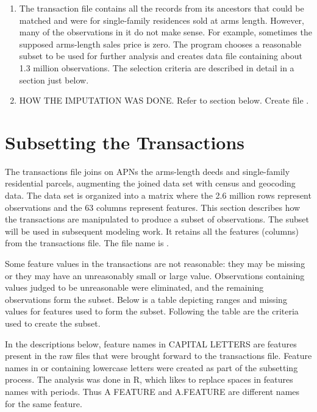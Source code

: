\begin{enumerate}
\item The transaction file contains all the records from its ancestors
  that could be matched and were for single-family residences sold at
  arms length. However, many of the observations in it do not make
  sense. For example, sometimes the supposed arms-length sales price
  is zero. The program  chooses a reasonable
  subset to be used for further analysis and creates data file
   containing about 1.3 million observations. The
  selection criteria are described in detail in a section just below.

\item HOW THE IMPUTATION WAS DONE. Refer to section below. Create file
  .
\end{enumerate}

\section{Subsetting the Transactions}


The transactions file joins on APNs the arms-length deeds and
single-family residential parcels, augmenting the joined data set with
census and geocoding data. The data set is organized into a matrix
where the 2.6 million rows represent observations and the 63 columns
represent features.  This section describes how the transactions are
manipulated to produce a subset of observations. The subset will be
used in subsequent modeling work. It retains all the features
(columns) from the transactions file. The file name is
.

Some feature values in the transactions are not reasonable: they may
be missing or they may have an unreasonably small or large
value. Observations containing values judged to be unreasonable were
eliminated, and the remaining observations form the subset.  Below is
a table depicting ranges and missing values for features used to form
the subset. Following the table are the criteria used to create the
subset.




In the descriptions below, feature names in CAPITAL LETTERS are
features present in the raw files that were brought forward to the
transactions file. Feature names in or containing lowercase letters
were created as part of the subsetting process. The analysis was done
in R, which likes to replace spaces in features names with
periods. Thus A FEATURE and A.FEATURE are different names for the same
feature.

